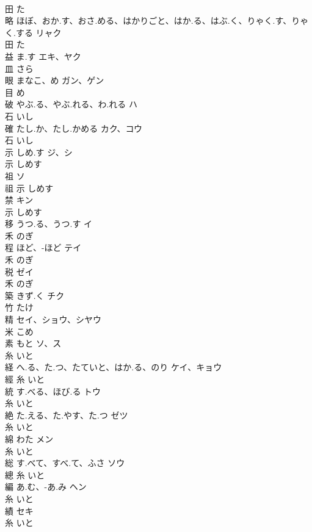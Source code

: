 \documentclass[8pt]{extreport}
\begin{document}
\begin{CJK}{UTF8}{min}
\\	田		た		
\\	略	ほぼ、おか.す、おさ.める、はかりごと、はか.る、はぶ.く、りゃく.す、りゃく.する	リャク	
\\	田		た		
\\	益	ま.す	エキ、ヤク	
\\	皿		さら		
\\	眼	まなこ、め	ガン、ゲン	
\\	目		め		
\\	破	やぶ.る、やぶ.れる、わ.れる	ハ	
\\	石		いし		
\\	確	たし.か、たし.かめる	カク、コウ	
\\	石		いし		
\\	示	しめ.す	ジ、シ	
\\	示		しめす		
\\	祖		ソ	
\\	祖	示		しめす		
\\	禁		キン	
\\	示		しめす		
\\	移	うつ.る、うつ.す	イ	
\\	禾		のぎ		
\\	程	ほど、-ほど	テイ	
\\	禾		のぎ		
\\	税		ゼイ	
\\	禾		のぎ		
\\	築	きず.く	チク	
\\	竹		たけ		
\\	精		セイ、ショウ、シヤウ	
\\	米		こめ		
\\	素	もと	ソ、ス	
\\	糸		いと		
\\	経	へ.る、た.つ、たていと、はか.る、のり	ケイ、キョウ	
\\	經	糸		いと		
\\	統	す.べる、ほび.る	トウ	
\\	糸		いと		
\\	絶	た.える、た.やす、た.つ	ゼツ	
\\	糸		いと		
\\	綿	わた	メン	
\\	糸		いと		
\\	総	す.べて、すべ.て、ふさ	ソウ	
\\	總	糸		いと		
\\	編	あ.む、-あ.み	ヘン	
\\	糸		いと		
\\	績		セキ	
\\	糸		いと		

\end{CJK}
\end{document}
